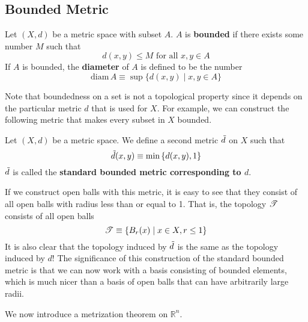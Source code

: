 \subsection{Bounded Metric}

  \begin{definition}
    Let $(X, d)$ be a metric space with subset $A$. $A$ is \textbf{bounded} if there exists some number $M$ such that
    \begin{equation}
      d (x, y) \leq M \text{ for all } x,y \in A
    \end{equation}
    If $A$ is bounded, the \textbf{diameter} of $A$ is defined to be the number
    \begin{equation}
      \text{diam}\, A \equiv \sup{\{d(x, y) \mid x, y \in A\}}
    \end{equation}
  \end{definition}

  Note that boundedness on a set is not a topological property since it depends on the particular metric $d$ that is used for $X$. For example, we can construct the following metric that makes every subset in $X$ bounded. 

  \begin{definition}
    Let $(X, d)$ be a metric space. We define a second metric $\Tilde{d}$ on $X$ such that
    \begin{equation}
      \Tilde{d} (x, y) \equiv \min{\{d(x, y), 1\}}
    \end{equation}
    $\Tilde{d}$ is called the \textbf{standard bounded metric corresponding to $d$}. 
  \end{definition}

  If we construct open balls with this metric, it is easy to see that they consist of all open balls with radius less than or equal to 1. That is, the topology $\operatorname{\mathscr{T}}$ consists of all open balls
  \begin{equation}
    \operatorname{\mathscr{T}} \equiv \{B_r (x) \mid x \in X, r \leq 1\}
  \end{equation}
  It is also clear that the topology induced by $\Tilde{d}$ is the same as the topology induced by $d$! The significance of this construction of the standard bounded metric is that we can now work with a basis consisting of bounded elements, which is much nicer than a basis of open balls that can have arbitrarily large radii.  

  We now introduce a metrization theorem on $\mathbb{R}^n$. 

